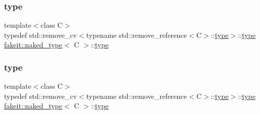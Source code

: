 \mbox{\label{structfakeit_1_1naked__type_a3248a6c417c3a06d6e93576085fe7fcc}} 
\subsubsection{\texorpdfstring{type}{type}\hspace{0.1cm}{\footnotesize\ttfamily [7/9]}}
{\footnotesize\ttfamily template$<$class C$>$ \\
typedef std\+::remove\+\_\+cv$<$typename std\+::remove\+\_\+reference$<$C$>$\+::\mbox{\hyperlink{structfakeit_1_1naked__type_a3248a6c417c3a06d6e93576085fe7fcc}{type}}$>$\+::\mbox{\hyperlink{structfakeit_1_1naked__type_a3248a6c417c3a06d6e93576085fe7fcc}{type}} \mbox{\hyperlink{structfakeit_1_1naked__type}{fakeit\+::naked\+\_\+type}}$<$ C $>$\+::\mbox{\hyperlink{structfakeit_1_1naked__type_a3248a6c417c3a06d6e93576085fe7fcc}{type}}}

\mbox{\label{structfakeit_1_1naked__type_a3248a6c417c3a06d6e93576085fe7fcc}} 
\subsubsection{\texorpdfstring{type}{type}\hspace{0.1cm}{\footnotesize\ttfamily [8/9]}}
{\footnotesize\ttfamily template$<$class C$>$ \\
typedef std\+::remove\+\_\+cv$<$typename std\+::remove\+\_\+reference$<$C$>$\+::\mbox{\hyperlink{structfakeit_1_1naked__type_a3248a6c417c3a06d6e93576085fe7fcc}{type}}$>$\+::\mbox{\hyperlink{structfakeit_1_1naked__type_a3248a6c417c3a06d6e93576085fe7fcc}{type}} \mbox{\hyperlink{structfakeit_1_1naked__type}{fakeit\+::naked\+\_\+type}}$<$ C $>$\+::\mbox{\hyperlink{structfakeit_1_1naked__type_a3248a6c417c3a06d6e93576085fe7fcc}{type}}}

\mbox{\label{structfakeit_1_1naked__type_a3248a6c417c3a06d6e93576085fe7fcc}} 
